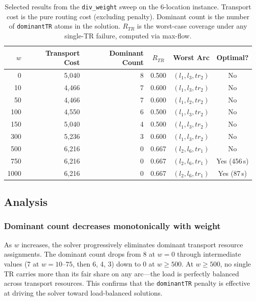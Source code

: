 \documentclass{article}
\begin{document}
\begin{table}[h]
\centering
\begin{tabular}{|r|r|r|c|l|c|}
\hline
$w$ & \textbf{Transport Cost} & \textbf{Dominant Count} & $R_{TR}$ & \textbf{Worst Arc} & \textbf{Optimal?} \\
\hline
0    & 5{,}040 & 8 & 0.500 & $(l_1,l_3,tr_2)$ & No \\
\hline
10   & 4{,}466 & 7 & 0.600 & $(l_1,l_3,tr_2)$ & No \\
\hline
50   & 4{,}466 & 7 & 0.600 & $(l_1,l_2,tr_2)$ & No \\
\hline
100  & 4{,}550 & 6 & 0.500 & $(l_1,l_3,tr_2)$ & No \\
\hline
150  & 5{,}040 & 4 & 0.500 & $(l_1,l_3,tr_2)$ & No \\
\hline
300  & 5{,}236 & 3 & 0.600 & $(l_1,l_3,tr_2)$ & No \\
\hline
500  & 6{,}216 & 0 & 0.667 & $(l_2,l_6,tr_1)$ & No \\
\hline
750  & 6{,}216 & 0 & 0.667 & $(l_2,l_6,tr_1)$ & Yes (456\,s) \\
\hline
1000 & 6{,}216 & 0 & 0.667 & $(l_2,l_6,tr_1)$ & Yes (87\,s) \\
\hline
\end{tabular}
\caption{Selected results from the \texttt{div\_weight} sweep on the 6-location instance. Transport cost is the pure routing cost (excluding penalty). Dominant count is the number of \texttt{dominantTR} atoms in the solution. $R_{TR}$ is the worst-case coverage under any single-TR failure, computed via max-flow.}
\label{tab:pareto-results}
\end{table}


\subsection{Analysis}

\subsubsection{Dominant count decreases monotonically with weight}

As $w$ increases, the solver progressively eliminates dominant transport resource assignments. The dominant count drops from 8 at $w=0$ through intermediate values (7 at $w=10$--$75$, then 6, 4, 3) down to 0 at $w \geq 500$. At $w \geq 500$, no single TR carries more than its fair share on any arc---the load is perfectly balanced across transport resources. This confirms that the \texttt{dominantTR} penalty is effective at driving the solver toward load-balanced solutions.
\end{document}

